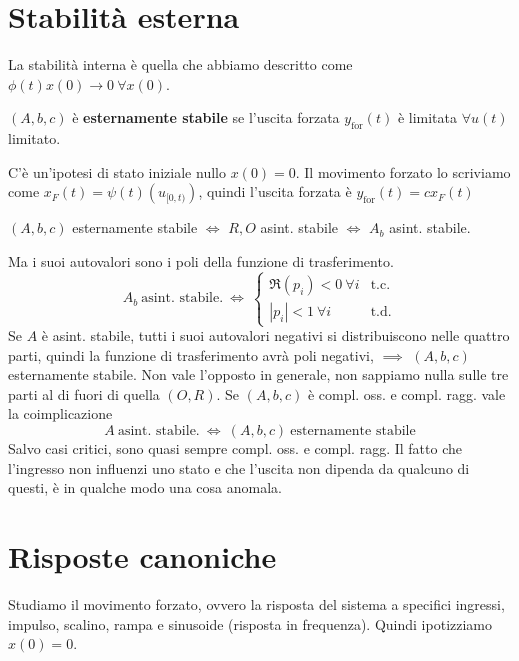 \chapter{Stabilità esterna}

La stabilità interna è quella che abbiamo descritto come $\phi (t) x(0)\to 0\ \forall x(0)$.
\begin{defn}
	$(A,b,c)$ è \textbf{esternamente stabile} se l'uscita forzata $y_{\text{for}}(t)$ è limitata $\forall u(t)$ limitato.
\end{defn}
C'è un'ipotesi di stato iniziale nullo $x(0) =0$. Il movimento forzato lo scriviamo come $x_F(t) =\psi (t)\left( u_{[ 0,t)}\right)$, quindi l'uscita forzata è $y_{\text{for}}(t) =cx_F(t)$
\begin{thm}
	$(A,b,c)$ esternamente stabile $\iff $ $R,O$ asint. stabile $\iff $ $A_b$ asint. stabile.
\end{thm}
Ma i suoi autovalori sono i poli della funzione di trasferimento.
\begin{equation*}
	A_b \ \text{asint. stabile.} \ \iff \ \begin{cases}
	\Re(p_i) < 0\ \forall i & \text{t.c.}\\
	| p_i| < 1\ \forall i & \text{t.d.}
	\end{cases}
\end{equation*}
Se $A$ è asint. stabile, tutti i suoi autovalori negativi si distribuiscono nelle quattro parti, quindi la funzione di trasferimento avrà poli negativi, $\implies $ $(A,b,c)$ esternamente stabile. Non vale l'opposto in generale, non sappiamo nulla sulle tre parti al di fuori di quella $(O,R)$. Se $(A,b,c)$ è compl. oss. e compl. ragg. vale la coimplicazione
\begin{equation*}
	A\ \text{asint. stabile.} \ \iff \ (A,b,c) \ \text{esternamente stabile}
\end{equation*}
Salvo casi critici, sono quasi sempre compl. oss. e compl. ragg. Il fatto che l'ingresso non influenzi uno stato e che l'uscita non dipenda da qualcuno di questi, è in qualche modo una cosa anomala.

\chapter{Risposte canoniche}

Studiamo il movimento forzato, ovvero la risposta del sistema a specifici ingressi, impulso, scalino, rampa e sinusoide (risposta in frequenza). Quindi ipotizziamo $x(0) =0$.

